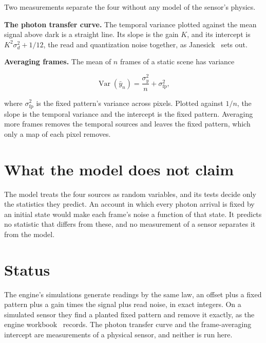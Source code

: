 Two measurements separate the four without any model of the sensor's physics.

\textbf{The photon transfer curve.} The temporal variance plotted against the mean signal above dark is a straight line. Its slope is the gain \(K\), and its intercept is \(K^2\sigma_d^2 + 1/12\), the read and quantization noise together, as Janesick~\cite{src:Janesick-2007} sets out.

\textbf{Averaging frames.} The mean of \(n\) frames of a static scene has variance

\[
\operatorname{Var}\left(\bar{y}_n\right) = \frac{\sigma_y^2}{n} + \sigma_{\mathrm{fp}}^2,
\]

where \(\sigma_{\mathrm{fp}}^2\) is the fixed pattern's variance across pixels. Plotted against \(1/n\), the slope is the temporal variance and the intercept is the fixed pattern. Averaging more frames removes the temporal sources and leaves the fixed pattern, which only a map of each pixel removes.

\section{\texorpdfstring{What the model does not claim}{What the model does not claim}}

The model treats the four sources as random variables, and its tests decide only the statistics they predict. An account in which every photon arrival is fixed by an initial state would make each frame's noise a function of that state. It predicts no statistic that differs from these, and no measurement of a sensor separates it from the model.

\section{\texorpdfstring{Status}{Status}}

The engine's simulations generate readings by the same law, an offset plus a fixed pattern plus a gain times the signal plus read noise, in exact integers. On a simulated sensor they find a planted fixed pattern and remove it exactly, as the engine workbook~\cite{src:Quigg-engine-workbook} records. The photon transfer curve and the frame-averaging intercept are measurements of a physical sensor, and neither is run here.
